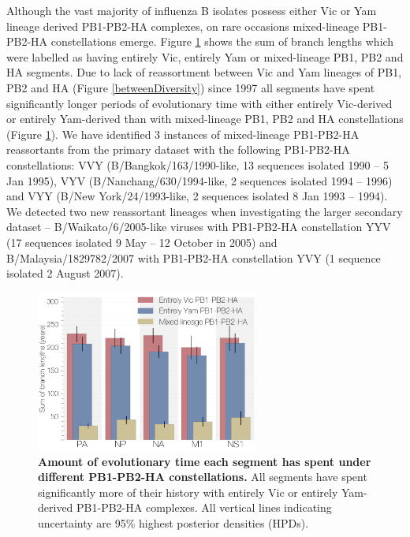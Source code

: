 \documentclass[11pt,oneside,letterpaper]{article}
\begin{document}
Although the vast majority of influenza B isolates possess either Vic or Yam lineage derived PB1-PB2-HA complexes, on rare occasions mixed-lineage PB1-PB2-HA constellations emerge.
Figure \ref{stateTime} shows the sum of branch lengths which were labelled as having entirely Vic, entirely Yam or mixed-lineage PB1, PB2 and HA segments.
Due to lack of reassortment between Vic and Yam lineages of PB1, PB2 and HA (Figure \ref{betweenDiversity}) since 1997 all segments have spent significantly longer periods of evolutionary time with either entirely Vic-derived or entirely Yam-derived than with mixed-lineage PB1, PB2 and HA constellations (Figure \ref{stateTime}).
We have identified 3 instances of mixed-lineage PB1-PB2-HA reassortants from the primary dataset with the following PB1-PB2-HA constellations: VVY (B/Bangkok/163/1990-like, 13 sequences isolated 1990 -- 5 Jan 1995), VYV (B/Nanchang/630/1994-like, 2 sequences isolated 1994 -- 1996) and VYY (B/New York/24/1993-like, 2 sequences isolated 8 Jan 1993 -- 1994).
We detected two new reassortant lineages when investigating the larger secondary dataset -- B/Waikato/6/2005-like viruses with PB1-PB2-HA constellation YYV (17 sequences isolated 9 May -- 12 October in 2005) and B/Malaysia/1829782/2007 with PB1-PB2-HA constellation YVY (1 sequence isolated 2 August 2007).

\begin{figure}[h]
	\centering		
	\includegraphics[width=0.65\textwidth]{figures/InfB_stateTimeAlt.png}
	\caption{\textbf{Amount of evolutionary time each segment has spent under different PB1-PB2-HA constellations.}
All segments have spent significantly more of their history with entirely Vic or entirely Yam-derived PB1-PB2-HA complexes.
All vertical lines indicating uncertainty are 95\% highest posterior densities (HPDs).}
	\label{stateTime}
\end{figure}
\end{document}
